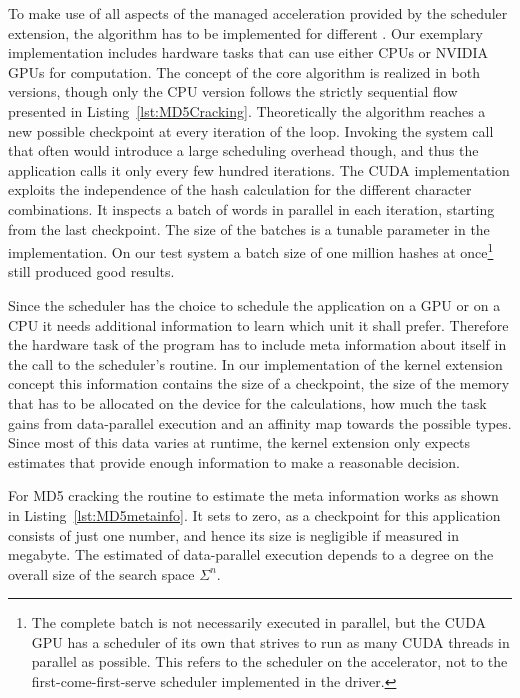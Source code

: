 To make use of all aspects of the managed acceleration provided by the scheduler extension, the algorithm has to be implemented for different \cus{}. Our exemplary implementation includes hardware tasks that can use either CPUs or NVIDIA GPUs for computation. The concept of the core algorithm is realized in both versions, though only the CPU version follows the strictly sequential flow presented in Listing~\ref{lst:MD5Cracking}. Theoretically the algorithm reaches a new possible checkpoint at every iteration of the loop. Invoking the  system call that often would introduce a large scheduling overhead though, and thus the application calls it only every few hundred iterations. The CUDA implementation exploits the independence of the hash calculation for the different character combinations. It inspects a batch of words in parallel in each iteration, starting from the last checkpoint. The size of the batches is a tunable parameter in the implementation. On our test system a batch size of one million hashes at once\footnote{The complete batch is not necessarily executed in parallel, but the CUDA GPU has a scheduler of its own that strives to run as many CUDA threads in parallel as possible. This refers to the scheduler on the accelerator, not to the first-come-first-serve scheduler implemented in the driver.} still produced good results.

Since the scheduler has the choice to schedule the application on a GPU or on a CPU it needs additional information to learn which unit it shall prefer. Therefore the hardware task of the program has to include meta information about itself in the call to the scheduler's  routine. In our implementation of the kernel extension concept this information contains the size of a checkpoint, the size of the memory that has to be allocated on the device for the calculations, how much the task gains from data-parallel execution and an affinity map towards the possible \cu{} types. Since most of this data varies at runtime, the kernel extension only expects estimates that provide enough information to make a reasonable decision.

For MD5 cracking the routine to estimate the meta information works as shown in Listing~\ref{lst:MD5metainfo}. It sets  to zero, as a checkpoint for this application consists of just one number, and hence its size is negligible if measured in megabyte. The estimated  of data-parallel execution depends to a degree on the overall size of the search space $\Sigma^{n}$.

